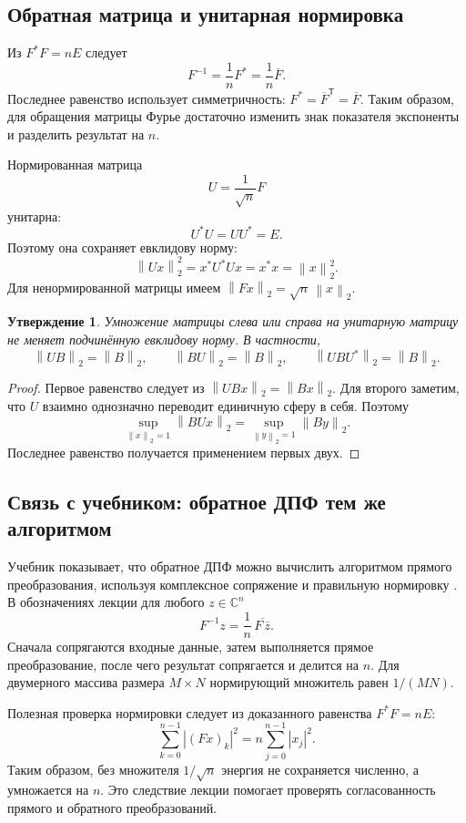 \documentclass[12pt,a4paper]{article}
\newtheorem{proposition}{Утверждение}
\theoremstyle{definition}
\theoremstyle{remark}
\newcommand{\CC}{\mathbb{C}}
\newcommand{\norm}[1]{\left\lVert #1\right\rVert}
\begin{document}
\subsection{Обратная матрица и унитарная нормировка}

Из $F^*F=nE$ следует
\[
  \boxed{F^{-1}=\frac1nF^*=\frac1n\overline F}.
\]
Последнее равенство использует симметричность: $F^*=\overline F^{\mathsf T}
=\overline F$. Таким образом, для обращения матрицы Фурье достаточно
изменить знак показателя экспоненты и разделить результат на $n$.

Нормированная матрица
\[
  U=\frac1{\sqrt n}F
\]
унитарна:
\[
  U^*U=UU^*=E.
\]
Поэтому она сохраняет евклидову норму:
\[
  \norm{Ux}_2^2=x^*U^*Ux=x^*x=\norm{x}_2^2.
\]
Для ненормированной матрицы имеем
$\norm{Fx}_2=\sqrt n\,\norm{x}_2$.

\begin{proposition}
Умножение матрицы слева или справа на унитарную матрицу не меняет
подчинённую евклидову норму. В частности,
\[
  \norm{UB}_2=\norm{B}_2,\qquad
  \norm{BU}_2=\norm{B}_2,\qquad
  \norm{UBU^*}_2=\norm{B}_2.
\]
\end{proposition}

\begin{proof}
Первое равенство следует из $\norm{UBx}_2=\norm{Bx}_2$.
Для второго заметим, что $U$ взаимно однозначно переводит единичную
сферу в себя. Поэтому
\[
  \sup_{\norm{x}_2=1}\norm{BUx}_2
  =\sup_{\norm{y}_2=1}\norm{By}_2.
\]
Последнее равенство получается применением первых двух.
\end{proof}

\subsection{Связь с учебником: обратное ДПФ тем же алгоритмом}

Учебник показывает, что обратное ДПФ можно вычислить алгоритмом
прямого преобразования, используя комплексное сопряжение
и правильную нормировку \cite[\S\,4.11.2, с.~352]{GW2012}.
В обозначениях лекции для любого $z\in\CC^n$
\[
  \boxed{F^{-1}z=\frac1n\,\overline{F\,\overline z}}.
\]
Сначала сопрягаются входные данные, затем выполняется прямое
преобразование, после чего результат сопрягается и делится на $n$.
Для двумерного массива размера $M\times N$ нормирующий множитель
равен $1/(MN)$.

Полезная проверка нормировки следует из доказанного равенства
$F^*F=nE$:
\[
  \sum_{k=0}^{n-1}|(Fx)_k|^2
  =n\sum_{j=0}^{n-1}|x_j|^2.
\]
Таким образом, без множителя $1/\sqrt n$ энергия не сохраняется
численно, а умножается на $n$. Это следствие лекции помогает
проверять согласованность прямого и обратного преобразований.
\end{document}
